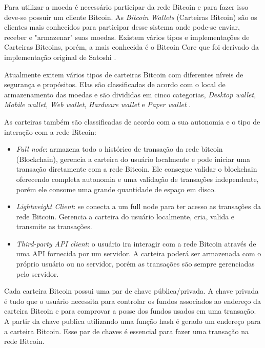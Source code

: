 \documentclass[conference,compsoc]{IEEEtran}
\begin{document}
Para utilizar a moeda é necessário participar da rede Bitcoin e para fazer isso deve-se possuir um cliente Bitcoin. As \textit{Bitcoin Wallets} (Carteiras Bitcoin) são os clientes mais conhecidos para participar desse sistema onde pode-se enviar, receber e "armazenar"{} suas moedas. Existem vários tipos e implementações de Carteiras Bitcoins, porém, a mais conhecida é o Bitcoin Core que foi derivado da implementação original de Satoshi \cite{antonopoulos2017mastering}. 

Atualmente exitem vários tipos de carteiras Bitcoin com diferentes níveis de segurança e propósitos. Elas são classificadas de acordo com o local de armazenamento das moedas e são divididas em cinco categorias, \textit{Desktop wallet}, \textit{Mobile wallet}, \textit{Web wallet}, \textit{Hardware wallet} e \textit{Paper wallet} \cite{antonopoulos2017mastering}. 

As carteiras também são classificadas de acordo com a sua autonomia e o tipo de interação com a rede Bitcoin:

\begin{itemize}
\item \textit{Full node}: armazena todo o histórico de transação da rede bitcoin (Blockchain), gerencia a carteira do usuário localmente e pode iniciar uma transação diretamente com a rede Bitcoin. Ele consegue validar o blockchain oferecendo completa autonomia e uma validação de transações independente, porém ele consome uma grande quantidade de espaço em disco.
\item \textit{Lightweight Client}: se conecta a um full node para ter acesso as transações da rede Bitcoin. Gerencia a carteira do usuário localmente, cria, valida e transmite as transações.
\item \textit{Third-party API client}: o usuário ira interagir com a rede Bitcoin através de uma API fornecida por um servidor. A carteira poderá ser armazenada com o próprio usuário ou no servidor, porém as transações são sempre gerenciadas pelo servidor.
\end{itemize}

Cada carteira Bitcoin possui uma par de chave pública/privada. A chave privada é tudo que o usuário necessita para controlar os fundos associados ao endereço da carteira Bitcoin e para comprovar a posse dos fundos usados em uma transação. A partir da chave publica utilizando uma função hash é gerado um endereço para a carteira Bitcoin. Esse par de chaves é essencial para fazer uma transação na rede Bitcoin.
\end{document}
